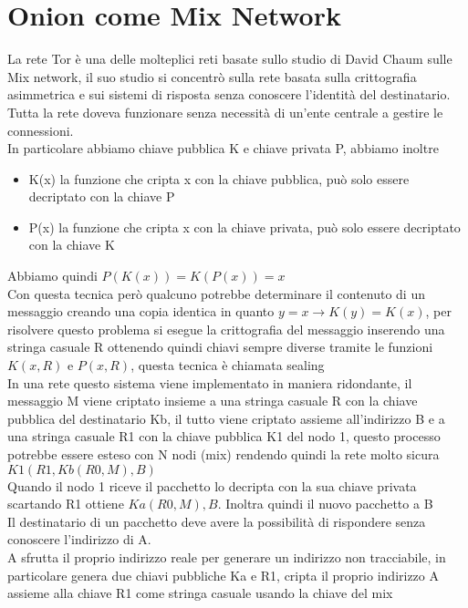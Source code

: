 \section{Onion come Mix Network}
La rete Tor è una delle molteplici reti basate sullo studio di David Chaum sulle Mix network, il suo studio si concentrò sulla rete basata sulla crittografia asimmetrica e sui sistemi di risposta senza conoscere l'identità del destinatario. Tutta la rete doveva funzionare senza necessità di un'ente centrale a gestire le connessioni. \\
In particolare abbiamo chiave pubblica K e chiave privata P, abbiamo inoltre
\begin{itemize}
    \item K(x) la funzione che cripta x con la chiave pubblica, può solo essere decriptato con la chiave P
    \item P(x) la funzione che cripta x con la chiave privata, può solo essere decriptato con la chiave K
\end{itemize}
Abbiamo quindi $P(K(x)) = K(P(x)) = x$ \\
Con questa tecnica però qualcuno potrebbe determinare il contenuto di un messaggio creando una copia identica in quanto $y = x → K(y) = K(x)$, per risolvere questo problema si esegue la crittografia del messaggio inserendo una stringa casuale R ottenendo quindi chiavi sempre diverse tramite le funzioni $K(x,R)$ e $P(x,R)$, questa tecnica è chiamata sealing \\
In una rete questo sistema viene implementato in maniera ridondante, il messaggio M viene criptato insieme a una stringa casuale R con la chiave pubblica del destinatario Kb, il tutto viene criptato assieme all'indirizzo B e a una stringa casuale R1 con la chiave pubblica K1 del nodo 1, questo processo potrebbe essere esteso con N nodi (mix) rendendo quindi la rete molto sicura \ 
$K1(R1, Kb(R0, M), B)$ \\
Quando il nodo 1 riceve il pacchetto lo decripta con la sua chiave privata scartando R1 ottiene $Ka(R0, M), B$. Inoltra quindi il nuovo pacchetto a B \\
Il destinatario di un pacchetto deve avere la possibilità di rispondere senza conoscere l'indirizzo di A. \\
A sfrutta il proprio indirizzo reale per generare un indirizzo non tracciabile, in particolare genera due chiavi pubbliche Ka e R1, cripta il proprio indirizzo A assieme alla chiave R1 come stringa casuale usando la chiave del mix \\
